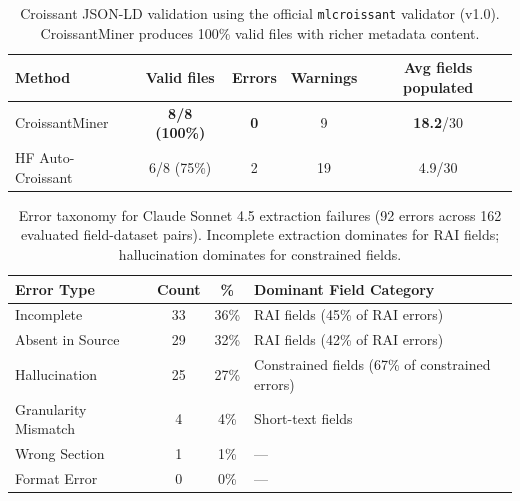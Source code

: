 
\begin{table}[t]
\centering
\caption{Croissant JSON-LD validation using the official \texttt{mlcroissant} validator (v1.0). CroissantMiner produces 100\% valid files with richer metadata content.}
\label{tab:validation}
\begin{tabular}{lcccc}
\toprule
Method & Valid files & Errors & Warnings & Avg fields populated \\
\midrule
CroissantMiner & \textbf{8/8 (100\%)} & \textbf{0} & 9 & \textbf{18.2}/30 \\
HF Auto-Croissant & 6/8 (75\%) & 2 & 19 & 4.9/30 \\
\bottomrule
\end{tabular}
\end{table}



\begin{table}[t]
\centering
\caption{Error taxonomy for Claude Sonnet 4.5 extraction failures (92 errors across 162 evaluated field-dataset pairs). Incomplete extraction dominates for RAI fields; hallucination dominates for constrained fields.}
\label{tab:error-taxonomy}
\begin{tabular}{lccp{5.5cm}}
\toprule
Error Type & Count & \% & Dominant Field Category \\
\midrule
Incomplete & 33 & 36\% & RAI fields (45\% of RAI errors) \\
Absent in Source & 29 & 32\% & RAI fields (42\% of RAI errors) \\
Hallucination & 25 & 27\% & Constrained fields (67\% of constrained errors) \\
Granularity Mismatch & 4 & 4\% & Short-text fields \\
Wrong Section & 1 & 1\% & --- \\
Format Error & 0 & 0\% & --- \\
\bottomrule
\end{tabular}
\end{table}



